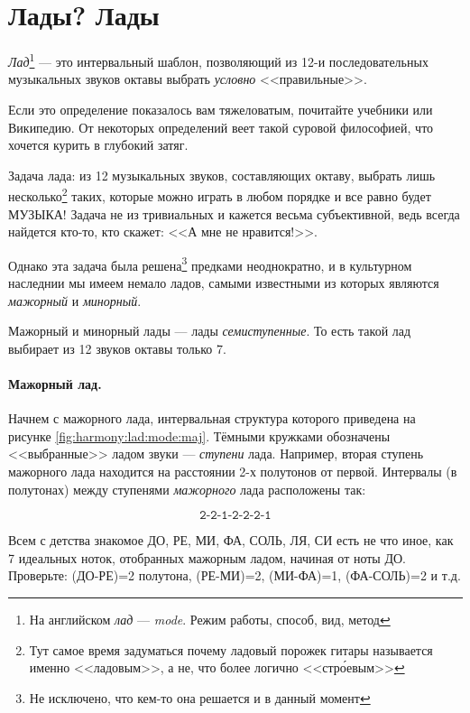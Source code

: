 \section{Лады? Лады}
\label{ch:harmony:lad}

\begin{Definition}[Лад]
    \emph{Лад}\footnote{На английском \emph{лад} --- \emph{mode}. Режим работы, способ, вид, метод} --- это интервальный шаблон, позволяющий из 12-и последовательных музыкальных звуков октавы выбрать \emph{условно} <<правильные>>. 
\end{Definition}

Если это определение показалось вам тяжеловатым, почитайте учебники или Википедию. От некоторых определений веет такой суровой философией, что хочется курить в глубокий затяг.

Задача лада: из 12 музыкальных звуков, составляющих октаву, выбрать лишь несколько\footnote{Тут самое время задуматься почему ладовый порожек гитары называется именно <<ладовым>>, а не, что более логично <<стр\'{о}евым>>} таких, которые можно играть в любом порядке и все равно будет МУЗЫКА! Задача не из тривиальных и кажется весьма субъективной, ведь всегда найдется кто-то, кто скажет: <<А мне не нравится!>>. 

Однако эта задача была решена\footnote{Не исключено, что кем-то она решается и в данный момент} предками неоднократно, и в культурном наследнии мы имеем немало ладов, самыми известными из которых являются \emph{мажорный} и \emph{минорный}.

Мажорный и минорный лады --- лады \emph{семиступенные}. То есть такой лад выбирает из 12 звуков октавы только 7.

\paragraph{Мажорный лад.} Начнем с мажорного лада, интервальная структура которого приведена на рисунке \ref{fig:harmony:lad:mode:maj}. Тёмными кружками обозначены <<выбранные>> ладом звуки --- \emph{ступени} лада. Например, вторая ступень мажорного лада находится на расстоянии 2-х полутонов от первой. Интервалы (в полутонах) между ступенями \emph{мажорного} лада расположены так:

\[
    \texttt{2-2-1-2-2-2-1}
\]

Всем с детства знакомое ДО, РЕ, МИ, ФА, СОЛЬ, ЛЯ, СИ есть не что иное, как 7 идеальных ноток, отобранных мажорным ладом, начиная от ноты ДО. Проверьте: (ДО-РЕ)=2 полутона, (РЕ-МИ)=2, (МИ-ФА)=1, (ФА-СОЛЬ)=2 и т.д. 

